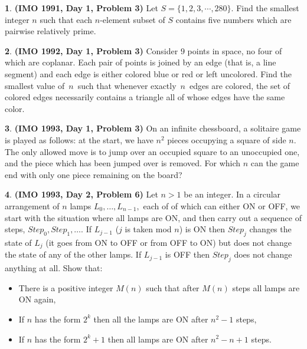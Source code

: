 \documentclass{article}
\newcommand{\equal}{=}
\theoremstyle{definition}
\newtheorem{p}{}
\begin{document}
\begin{p}{\bf (IMO 1991, Day 1, Problem 3)}
Let $ S \equal{} \{1,2,3,\cdots ,280\}$. Find the smallest integer $ n$ such that each $ n$-element subset of $ S$ contains five numbers which are pairwise relatively prime.
\end{p}





\begin{p}{\bf (IMO 1992, Day 1, Problem 3)}
Consider $9$ points in space, no four of which are coplanar. Each pair of points is joined by an edge (that is, a line segment) and each edge is either colored blue or red or left uncolored. Find the smallest value of  $\,n\,$ such that whenever exactly $\,n\,$ edges are colored, the set of colored edges necessarily contains a triangle all of whose edges have the same color.
\end{p}


\begin{p}{\bf (IMO 1993, Day 1, Problem 3)}
On an infinite chessboard, a solitaire game is played as follows: at the start, we have $n^2$ pieces occupying a square of side $n.$ The only allowed move is to jump over an occupied square to an unoccupied one, and the piece which has been jumped over is removed. For which $n$ can the game end with only one piece remaining on the board?
\end{p}



\begin{p}{\bf (IMO 1993, Day 2, Problem 6)}
Let $n > 1$ be an integer. In a circular arrangement of $n$ lamps $L_0, \ldots, L_{n-1},$ each of of which can either ON or OFF, we start with the situation where all lamps are ON, and then carry out a sequence of steps, $Step_0, Step_1, \ldots .$  If $L_{j-1}$ ($j$ is taken mod $n$) is ON then $Step_j$ changes the state of $L_j$ (it goes from ON to OFF or from OFF to ON) but does not change the state of any of the other lamps. If $L_{j-1}$ is OFF then $Step_j$ does not change anything at all. Show that:
\begin{itemize}
\item There is a positive integer $M(n)$ such that after $M(n)$ steps all lamps are ON again,

\item If $n$ has the form $2^k$ then all the lamps are ON after $n^2-1$ steps,

\item If $n$ has the form $2^k + 1$ then all lamps are ON after $n^2 - n + 1$ steps.
\end{itemize}
\end{p}
\end{document}
